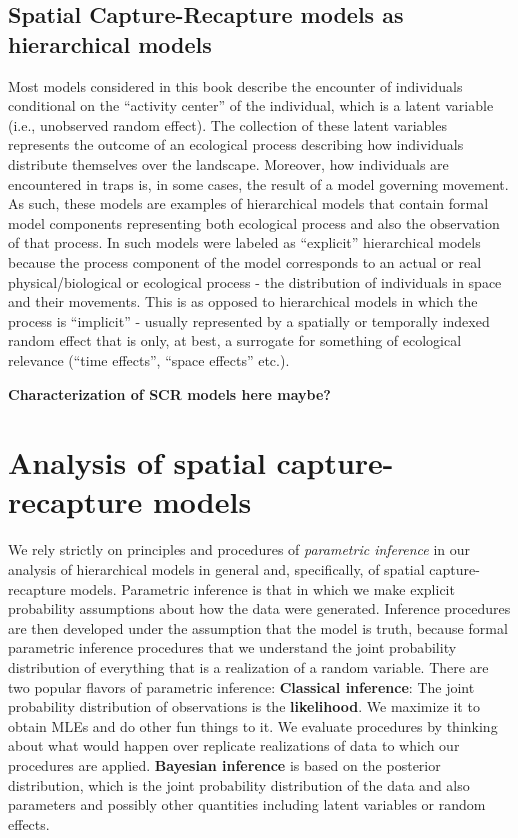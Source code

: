 \subsection{Spatial Capture-Recapture models as hierarchical models}

Most models considered in this book describe the encounter of
individuals conditional on the ``activity center'' of the individual,
which is a latent variable (i.e., unobserved random effect).  The
collection of these latent variables represents the outcome of an
ecological process describing how individuals distribute themselves
over the landscape. Moreover, how individuals are encountered in traps
is, in some cases, the result of a model governing movement.  As such,
these models are examples of hierarchical models that contain formal
model components representing both ecological process and also the
observation of that process. In \citet{royle_dorazio:2008} such models
were labeled as ``explicit'' hierarchical models because the process
component of the model corresponds to an actual or real
physical/biological or ecological process - the distribution of
individuals in space and their movements.  This is as opposed to
hierarchical models in which the process is ``implicit'' - usually
represented by a spatially or temporally indexed random effect that is
only, at best, a surrogate for something of ecological relevance
(``time effects'', ``space effects'' etc.).

{\bf Characterization of SCR models here maybe?}


\section{Analysis of spatial capture-recapture models}

We rely strictly on principles and procedures of {\it parametric
  inference} in our analysis of hierarchical models in general and,
specifically, of spatial capture-recapture models. Parametric
inference is that in which we make explicit probability assumptions
about how the data were generated. Inference procedures are then
developed under the assumption that the model is truth, because formal
parametric inference procedures that we understand the joint
probability distribution of everything that is a realization of a
random variable. There are two popular flavors of parametric
inference: {\bf Classical inference}: The joint probability distribution
of observations is the {\bf likelihood}. We maximize it to obtain MLEs
and do other fun things to it. We evaluate procedures by thinking
about what would happen over replicate realizations of data to which
our procedures are applied.  {\bf Bayesian inference} is based on the
posterior distribution, which is the joint probability distribution of
the data and also parameters and possibly other quantities including
latent variables or random effects.

